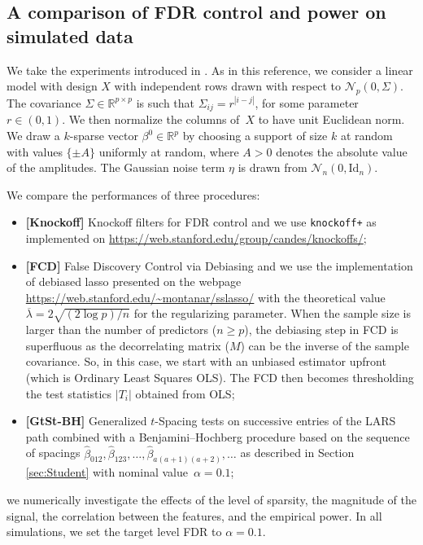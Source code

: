 \documentclass[final,numbib]{imaiai}%
\numberwithin{equation}{section}
\renewcommand{\bar}{\overline}
\renewcommand{\hat}{\widehat}
\newcommand{\<}{\langle}
\renewcommand{\>}{\rangle}
\newcommand{\1}{\mathds{1}}
\begin{document}
{\subsection{{A comparison of FDR control and power on simulated data}}
\label{sec:simulated}
We take the experiments introduced in \cite[Section 5]{javanmard2019false}. As in this reference, we consider a linear model with design $X$ with independent rows drawn with respect to $\mathcal N_p(0,\Sigma)$. The covariance $\Sigma\in\mathds R^{p\times p}$ is such that $\Sigma_{ij} = r^{|i-j|}$, for some parameter $r\in(0,1)$. We then normalize the columns of~$X$ to have unit Euclidean norm. We draw a $k$-sparse vector $\beta^0\in \mathds R^p$ by choosing a support of size $k$ at random with values $\{\pm A\}$ uniformly at random, where $A>0$ denotes the absolute value of the amplitudes. The Gaussian noise term $\eta$ is drawn from $\mathcal N_n(0,\mathrm{Id}_{n})$. 


\noindent
We compare the performances of three procedures:
\begin{itemize}
\item {\bf [Knockoff]} Knockoff filters for FDR control \citep{barber2015controlling} and we use {\tt knockoff+} as implemented on \url{https://web.stanford.edu/group/candes/knockoffs/}; 
\item {\bf [FCD]} False Discovery Control via Debiasing \cite[Section 5]{javanmard2019false} and we use the implementation of debiased lasso presented on the webpage \url{https://web.stanford.edu/~montanar/sslasso/} with the theoretical value $\bar\lambda=2\sqrt{(2\log p)/n}$ for the regularizing parameter. When the sample size is larger than the number of predictors ($n\geq p$), the debiasing step in FCD is superfluous as the decorrelating matrix ($M$) can be the inverse of the sample covariance. So, in this case, we start with an unbiased estimator upfront (which is Ordinary Least Squares OLS). The FCD then becomes thresholding the test statistics $|T_i|$ obtained from OLS;
\item {\bf [GtSt-BH]} Generalized $t$-Spacing tests on successive entries of the LARS path combined with a Benjamini–Hochberg procedure \cite{benjamini1995controlling} based on the sequence of spacings $\hat  \beta_{012},\hat  \beta_{123},\ldots,\hat  \beta_{a(a+1)(a+2)},\ldots$ 
as described in Section  \ref{sec:Student} with nominal value~$\alpha= 0.1$;
\end{itemize}
we numerically investigate the effects of the level of sparsity, the magnitude of the signal, the correlation between the features, and the empirical power. In all simulations, we set the target level FDR to $\alpha= 0.1$.

}
\end{document}
